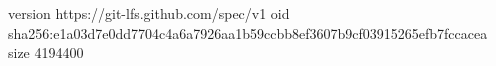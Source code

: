 version https://git-lfs.github.com/spec/v1
oid sha256:e1a03d7e0dd7704c4a6a7926aa1b59ccbb8ef3607b9cf03915265efb7fccacea
size 4194400
